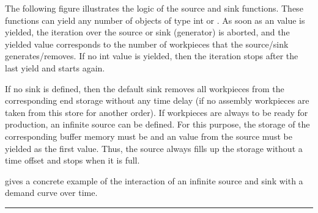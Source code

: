 \documentclass[letterpaper,10pt,english]{sphinxmanual}
\begin{document}
\sphinxAtStartPar
The following figure illustrates the logic of the source and sink functions. These functions can yield any number of
objects of type int or . As soon as an  value is yielded, the iteration over the source or sink
(generator) is aborted, and the yielded value corresponds to the number of workpieces that the source/sink
generates/removes. If no int value is yielded, then the iteration stops after the last yield and starts again.


\sphinxAtStartPar
If no sink is defined, then the default sink removes all workpieces from the corresponding end storage without any time
delay (if no assembly workpieces are taken from this store for another order). If workpieces are always to be ready for
production, an infinite source can be defined. For this purpose, the storage of the corresponding buffer memory must be
and an  value from the source must be yielded as the first value. Thus, the source always fills up the storage
without a time offset and stops when it is full.

\begin{sphinxVerbatim}[commandchars=\\\{\}]
  
     
\end{sphinxVerbatim}

\sphinxAtStartPar
{\hyperref[\detokenize{source/Examples/example03:id1}]{}} gives a concrete example of the interaction of an infinite source and sink with a demand
curve over time.


\bigskip\hrule\bigskip
\end{document}
